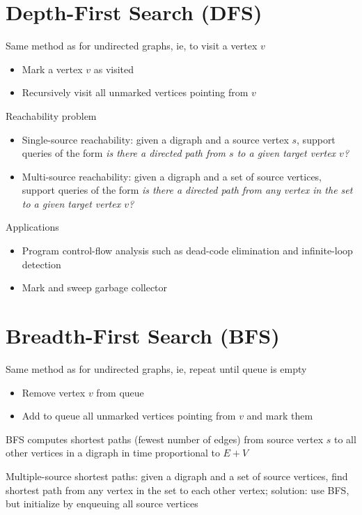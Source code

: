 \documentclass[8pt,a4paper,compress]{beamer}
\begin{document}
\section{Depth-First Search (DFS)}
\begin{frame}[fragile]
Same method as for undirected graphs, ie, to visit a vertex $v$
\begin{itemize}
\item Mark a vertex $v$ as visited

\item Recursively visit all unmarked vertices pointing from $v$
\end{itemize}

\bigskip

Reachability problem
\begin{itemize}
\item Single-source reachability: given a digraph and a source vertex $s$, support queries of the form \emph{is there a directed path from $s$ to a given target vertex $v$?}

\item Multi-source reachability: given a digraph and a set of source vertices, support queries of the form \emph{is there a directed path from any vertex in the set to a given target vertex $v$?}
\end{itemize}

\bigskip

Applications
\begin{itemize}
\item Program control-flow analysis such as dead-code elimination and  infinite-loop detection

\item Mark and sweep garbage collector
\end{itemize}
\end{frame}

\section{Breadth-First Search (BFS)}
\begin{frame}[fragile]
Same method as for undirected graphs, ie, repeat until queue is empty
\begin{itemize}
\item Remove vertex $v$ from queue

\item Add to queue all unmarked vertices pointing from $v$ and mark them
\end{itemize}

\bigskip

BFS computes shortest paths (fewest number of edges)
from source vertex $s$ to all other vertices in a digraph in time proportional to $E + V$

\bigskip

Multiple-source shortest paths: given a digraph and a set of source vertices, find shortest path from any vertex in the set to each other vertex; solution: use BFS, but initialize by enqueuing all source vertices
\end{frame}
\end{document}
